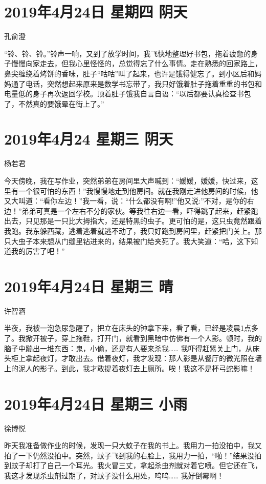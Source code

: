 \section{2019年4月24日 星期四 阴天}

孔俞澄

“铃、铃、铃。”铃声一响，又到了放学时间，我飞快地整理好书包，拖着疲惫的身子慢慢向家走去，但我心里怪怪的，总觉得忘了什么事情。走在熟悉的回家路上，鼻尖缠绕着烤饼的香味，肚子“咕咕”叫了起来，也许是饿得健忘了。到小区后和妈妈通了电话，突然想起来原来是数学书忘带了，我只好饿着肚子拖着重重的书包和电量低的身子再次返回学校。顶着肚子饿我自言自语：“以后都要认真检查书包了，不然真的要饿晕在街上了。”

\section{2019年4月24 星期三 阴天}

杨若君

今天傍晚，我在写作业，突然弟弟在房间里大声喊到：“媛媛，媛媛，快过来，这里有一个很可怕的东西！”我慢慢地走到他房间。就在我刚走进他房间的时候，他又大叫道：“看你左边！”我一看，说：“什么都没有啊!”他又说:”不对，是你的右边！”弟弟可真是一个左右不分的家伙。等我往右边一看，吓得跳了起来，赶紧跑出去，只见那是一只比大拇指大，还是特黑的虫子。更可怕的是，这只虫竟然跟着我跑。我东躲西藏，逃着逃着就逃不动了，我只好跑到房间里，赶紧把门关上。那只大虫子本来想从门缝里钻进来的，结果被门给夹死了。我大笑道：“哈，这下知道我的厉害了吧！”

\section{2019年4月24日 星期三 晴}

许智涵

半夜，我被一泡急尿急醒了，把立在床头的钟拿下来，看了看，已经是凌晨1点多了。我掀开被子，穿上拖鞋，打开门，就看到黑暗中仿佛有一个人影。顿时，我的脑子中蹦出一堆东西：鬼，小偷，还是有人要来杀我…… 我吓得赶紧关上门，从床头柜上拿起夜灯，才敢出去。借着夜灯，我才发现：那人影是从餐厅的微光照在墙上的泥人的影子。到此，我才敢提着夜灯去上厕所。唉！我这不是杯弓蛇影嘛！

\section{2019年4月24日 星期三 小雨}

徐博悦

昨天我准备做作业的时候，发现一只大蚊子在我的书上。我用力一拍没拍中，我又拍了一下仍然没拍中。突然，蚊子飞到我的右脸上，我用力一拍，“啪！”结果没拍到蚊子却打了自己一个耳光。我火冒三丈，拿起杀虫剂就对着它喷。但它还在飞，我这才发现杀虫剂过期了，对蚊子没什么用处，呜呜…… 我好倒霉啊！

